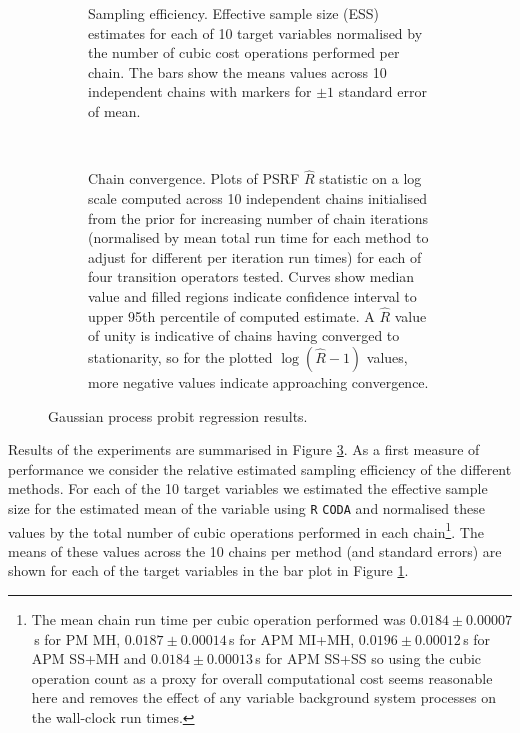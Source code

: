 \begin{figure}[!t]
\centering
\begin{subfigure}[b]{\linewidth}
\centering
{}
\caption{Sampling efficiency. Effective sample size (ESS) estimates for each of 10 target variables normalised by the number of cubic cost operations performed per chain. The bars show the means values across 10 independent chains with markers for $\pm 1$ standard error of mean.}
\label{sfig:gaussian-process-probit-regressions-pm-ess-plot}
\end{subfigure}
\\[3mm]
\begin{subfigure}[b]{\linewidth}
\centering
{}
\caption{Chain convergence. Plots of \acs{PSRF} $\hat{R}$ statistic on a log scale computed across 10 independent chains initialised from the prior for increasing number of chain iterations (normalised by mean total run time for each method to adjust for different per iteration run times) for each of four transition operators tested. Curves show median value and filled regions indicate confidence interval to upper 95th percentile of computed estimate. A $\hat{R}$ value of unity is indicative of chains having converged to stationarity, so for the plotted $\log(\hat{R} - 1)$ values, more negative values indicate approaching convergence.}
\label{sfig:gaussian-process-probit-regressions-pm-prsf-plot}
\end{subfigure}
\caption[Gaussian process probit regression results.]{Gaussian process probit regression results.}
\label{fig:pm-gp-probit-regression-results}
\end{figure}

Results of the experiments are summarised in Figure \ref{fig:pm-gp-probit-regression-results}. As a first measure of performance we consider the relative estimated sampling efficiency of the different methods. For each of the 10 target variables we estimated the effective sample size for the estimated mean of the variable using \texttt{R} \texttt{CODA} \citep{plummer2006coda} and normalised these values by the total number of cubic operations performed in each chain\footnote{The mean chain run time per cubic operation performed was $0.0184 \pm 0.00007$\,s for \ac{PM} \ac{MH}, $0.0187 \pm 0.00014$\,s for \ac{APM} \ac{MI}+\ac{MH}, $0.0196 \pm 0.00012$\,s for \ac{APM} \ac{SS}+\ac{MH} and $0.0184 \pm 0.00013$\,s for \ac{APM} \ac{SS}+\ac{SS} so using the cubic operation count as a proxy for overall computational cost seems reasonable here and removes the effect of any variable background system processes on the wall-clock run times.}. The means of these values across the 10 chains per method (and standard errors) are shown for each of the target variables in the bar plot in Figure \ref{sfig:gaussian-process-probit-regressions-pm-ess-plot}.

